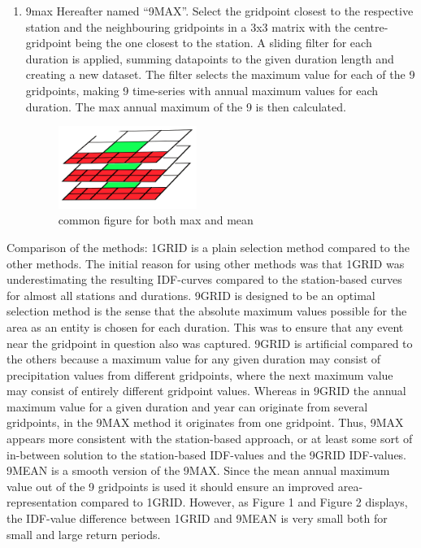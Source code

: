 \begin{enumerate}
\item 9max
Hereafter named “9MAX”. Select the gridpoint closest to the respective station and the neighbouring gridpoints in a 3x3 matrix with the centre-gridpoint being the one closest to the station. A sliding filter for each duration is applied, summing datapoints to the given duration length and creating a new dataset. The filter selects the maximum value for each of the 9 gridpoints, making 9 time-series with annual maximum values for each duration. The max annual maximum of the 9 is then calculated.

\begin{figure}[hbt!]
    \centering
    \includegraphics[width=4.5cm]{figures/met9max_mean.PNG}
    \caption{common figure for both max and mean}
    \label{fig:my_label}
\end{figure}

\end{enumerate}

Comparison of the methods: 
1GRID is a plain selection method compared to the other methods. The initial reason for using other methods was that 1GRID was underestimating the resulting IDF-curves compared to the station-based curves for almost all stations and durations. 9GRID is designed to be an optimal selection method is the sense that the absolute maximum values possible for the area as an entity is chosen for each duration. This was to ensure that any event near the gridpoint in question also was captured. 9GRID is artificial compared to the others because a maximum value for any given duration may consist of precipitation values from different gridpoints, where the next maximum value may consist of entirely different gridpoint values. Whereas in 9GRID the annual maximum value for a given duration and year can originate from several gridpoints, in the 9MAX method it originates from one gridpoint. Thus, 9MAX appears more consistent with the station-based approach, or at least some sort of in-between solution to the station-based IDF-values and the 9GRID IDF-values. 9MEAN is a smooth version of the 9MAX. Since the mean annual maximum value out of the 9 gridpoints is used it should ensure an improved area-representation compared to 1GRID. However, as Figure 1 and Figure 2 displays, the IDF-value difference between 1GRID and 9MEAN is very small both for small and large return periods.    

